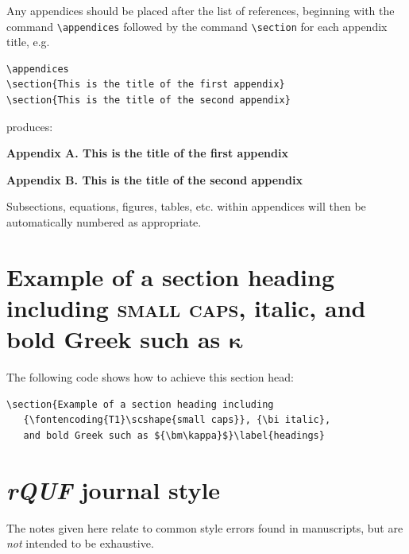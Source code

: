 \documentclass{rQUF2e}
\theoremstyle{plain}
\theoremstyle{definition}
\theoremstyle{remark}
\begin{document}
Any appendices should be placed after the list of references, beginning with the
command \verb"\appendices" followed by the command \verb"\section"
for each appendix title, e.g.
\begin{verbatim}
\appendices
\section{This is the title of the first appendix}
\section{This is the title of the second appendix}
\end{verbatim}

\noindent produces:\medskip

\noindent\textbf{Appendix A. This is the title of the first appendix}\medskip

\noindent\textbf{Appendix B. This is the title of the second appendix}\medskip

\noindent Subsections, equations, figures, tables, etc. within
appendices will then be automatically numbered as appropriate.


\section{Example of a section heading including
   {\scshape{small caps}}, {\bi italic},
   and bold Greek such as ${\bm\kappa}$}\label{headings}

The following code shows how to achieve this section head:
\begin{verbatim}
\section{Example of a section heading including
   {\fontencoding{T1}\scshape{small caps}}, {\bi italic},
   and bold Greek such as ${\bm\kappa}$}\label{headings}
\end{verbatim}


\section{{\textit{rQUF}} journal style}

The notes given here relate to common style errors found in manuscripts, but are \emph{not} intended to be exhaustive.
\end{document}
